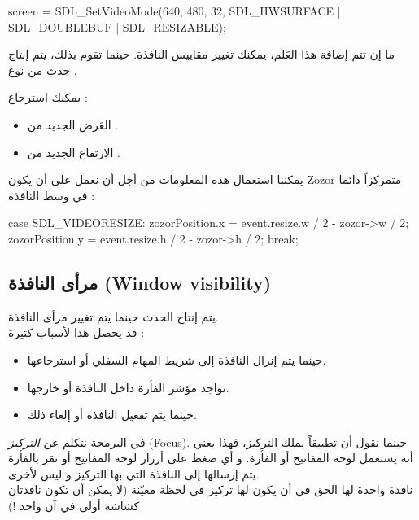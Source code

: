 \begin{Csource}
screen = SDL_SetVideoMode(640, 480, 32, SDL_HWSURFACE | SDL_DOUBLEBUF | SDL_RESIZABLE);
\end{Csource}

ما إن تتم إضافة هذا العَلم، يمكنك تغيير مقاييس النافذة. حينما تقوم بذلك، يتم إنتاج  حدث من نوع
.

يمكنك استرجاع :

\begin{itemize}
	\item العَرض الجديد من
	.
	\item الارتفاع الجديد من
	.
\end{itemize}

يمكننا استعمال هذه المعلومات من أجل أن نعمل على أن يكون
\textenglish{Zozor}
متمركزاً دائما في وسط النافذة :

\begin{Csource}
case SDL_VIDEORESIZE:
zozorPosition.x = event.resize.w / 2 - zozor->w / 2;
zozorPosition.y = event.resize.h / 2 - zozor->h / 2;
break;
\end{Csource}

\subsection{مرأى النافذة (\textenglish{Window visibility})}

يتم إنتاج الحدث
حينما يتم تغيير مرأى النافذة.\\
قد يحصل هذا لأسباب كثيرة :

\begin{itemize}
	\item حينما يتم إنزال النافذة إلى شريط المهام السفلي أو استرجاعها.
	\item تواجد مؤشر الفأرة داخل النافذة أو خارجها.
	\item حينما يتم تفعيل النافذة أو إلغاء ذلك.
\end{itemize}

\begin{information}
في البرمجة نتكلم عن
\textit{التركيز}
(\textenglish{Focus}).
حينما نقول أن تطبيقاً يملك التركيز، فهذا يعني أنه يستعمل لوحة المفاتيح أو الفأرة. و أي ضغط على أزرار لوحة المفاتيح أو نقر بالفأرة يتم إرسالها إلى النافذة التي بها التركيز و ليس لأخرى.\\
نافذة واحدة لها الحق في أن يكون لها تركيز في لحظة معيّنة (لا يمكن أن تكون نافذتان كشاشة أولى في آن واحد !)
\end{information}

